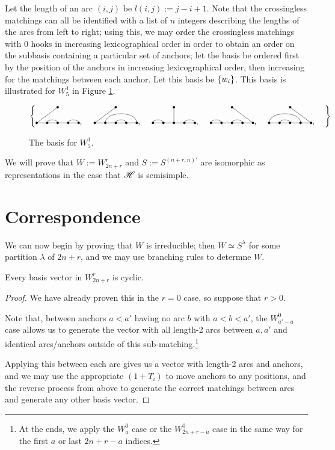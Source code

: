 \documentclass{amsart}
\begin{document}
Let the length of an arc $(i,j)$ be $l(i,j) := j - i + 1$.
Note that the crossingless matchings can all be identified with a list of $n$ integers describing the lengths of the arcs from left to right;
using this, we may order the crossingless matchings with 0 hooks in increasing lexicographical order in order to obtain an order on the subbasis containing a particular set of anchors;
let the basis be ordered first by the position of the anchors in increasing lexicographical order, then increasing for the matchings between each anchor.
Let this basis be $\left\{ w_i \right\}$.
This basis is illustrated for $W_{5}^1$ in Figure \ref{S5 Basis}. 

\begin{figure}
  \def\cbasisspacing{5mm}
  $\cbr{
    \begin{gathered}
      \GeneralizedMatching{5}{2/3, 4/5}{1}{1/1}{3/4}, \hspace{\cbasisspacing}
      \GeneralizedMatching{5}{2/5, 3/4}{1}{1/1}{3/4}, \hspace{\cbasisspacing}
      \GeneralizedMatching{5}{1/2, 4/5}{1}{3/1}{3/4}, \hspace{\cbasisspacing}
      \GeneralizedMatching{5}{1/2, 3/4}{1}{5/1}{3/4}, \hspace{\cbasisspacing}
      \GeneralizedMatching{5}{1/4, 2/3}{1}{5/1}{3/4}, \hspace{\cbasisspacing}
     \end{gathered}}$ 
    \caption{The basis for $W_5^1$.}
  \label{S5 Basis}
\end{figure} 

We will prove that $W := W_{2n+r}^r$ and $S := S^{(n+r,n)'}$ are isomorphic as representations in the case that $\mathscr{H}$ is semisimple.

\newpage
\section{Correspondence} 
We can now begin by proving that $W$ is irreducible;
then $W \simeq S^\lambda$ for some partition $\lambda$ of $2n + r$, and we may use branching rules to determne $W$.
\begin{lemma}
  Every basis vector in $W_{2n + r}^r$ is cyclic.
\end{lemma}
\begin{proof}
  We have already proven this in the $r = 0$ case, so suppose that $r > 0$.

    Note that, between anchors $a<a'$ having no arc $b$ with $a < b < a'$, the $W_{a'-a}^0$ case allows us to generate the vector with all length-2 arcs between $a,a'$ and identical arcs/anchors outside of this sub-matching.\footnote{At the ends, we apply the $W_a^0$ case or the $W_{2n + r - a}^{0}$ case in the same way for the first $a$ or last $2n + r - a$ indices.}

  Applying this between each arc gives us a vector with length-2 arcs and anchors, and we may use the appropriate $(1+T_i)$ to move anchors to any positions, and the reverse process from above to generate the correct matchings between arcs and generate any other basis vector.
\end{proof}
\end{document}
